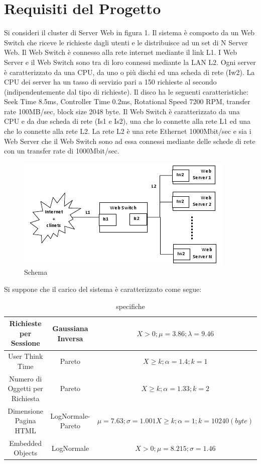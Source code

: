 \section{Requisiti del Progetto}
Si consideri il cluster di Server Web in figura 1. Il sistema è composto da un Web Switch che riceve le richieste dagli utenti e le distribuisce ad un set di N Server Web. Il Web Switch è connesso alla rete internet mediante il link L1. I Web Server e il Web Switch sono tra di loro connessi mediante la LAN L2. 
Ogni server è caratterizzato da una CPU, da uno o più dischi ed una scheda di rete (Iw2). La CPU dei server ha un tasso di servizio pari a 150 richieste al secondo (indipendentemente dal tipo di richieste). Il disco ha le seguenti caratteristiche: Seek Time 8.5ms, Controller Time 0.2ms, Rotational Speed 7200 RPM, transfer rate 100MB/sec, block size 2048 byte. 
Il Web Switch è caratterizzato da una CPU e da due scheda di rete (Is1 e Is2), una che lo connette alla rete L1 ed una che lo connette alla rete L2. 
La rete L2 è una rete Ethernet 1000Mbit/sec e sia i Web Server che il Web Switch sono ad essa connessi mediante delle schede di rete con un transfer rate di 1000Mbit/sec. 
\begin{figure}[H]
\begin{center}
\includegraphics[scale=0.5]{etc/schema1.png}
\caption{Schema}
\label{schema1}
\end{center}
\end{figure}
Si suppone che il carico del sistema è caratterizzato come segue:
\begin{table}[H]
\begin{center}
\begin{tabular}{||c|c|c||}
\hline
Richieste per Sessione	&Gaussiana Inversa	&$X > 0; \mu = 3.86; \lambda = 9.46$	\\
\hline
\hline
User Think Time				&Pareto						&$X \geq k; \alpha=1.4; k = 1$	\\
\hline
Numero di Oggetti per Richiesta	&Pareto			&$X \geq k; \alpha=1.33; k = 2$	\\
\hline
Dimensione Pagina HTML	&LogNormale-Pareto	&$\mu = 7.63; \sigma = 1.001 X \geq k; \alpha=1; k = 10240 (byte)$	\\
\hline
Embedded Objects				&LogNormale			&$X > 0; \mu = 8.215; \sigma = 1.46$	\\
\hline
\end{tabular}
\end{center}
\caption{specifiche}
\label{test_1}
\end{table}
